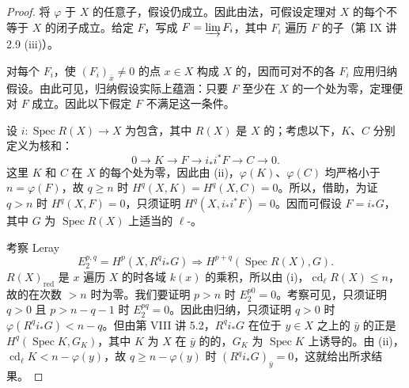 \begin{proof}
将 $\varphi$ 于 $X$ 的任意子，假设仍成立。因此由法，可假设定理对 $X$ 的每个不等于
$X$ 的闭子成立。给定 $F$，写成 $F=\varinjlim F_i$，其中 $F_i$ 遍历 $F$ 的子（第 IX 讲 2.9 (iii)）。

对每个 $F_i$，使 $(F_i)_{\bar x}\ne0$ 的点 $x\in X$ 构成 $X$ 的，因而可对不的各 $F_i$ 应用归纳假设。由此可见，归纳假设实际上蕴涵：只要 $F$ 至少在 $X$ 的一个处为零，定理便对 $F$ 成立。因此以下假定 $F$ 不满足这一条件。

设 $i:\operatorname{Spec}R(X)\to X$ 为包含，其中 $R(X)$ 是 $X$ 的；考虑以下，$K$、$C$ 分别定义为核和：
\[
 0\longrightarrow K\longrightarrow F\longrightarrow i_*i^*F\longrightarrow C\longrightarrow0.
\]
这里 $K$ 和 $C$ 在 $X$ 的每个处为零，因此由 (ii)，$\varphi(K)$、$\varphi(C)$ 均严格小于 $n=\varphi(F)$，故 $q\geq n$ 时 $H^q(X,K)=H^q(X,C)=0$。所以，借助，为证 $q>n$ 时 $H^q(X,F)=0$，只须证明 $H^q(X,i_*i^*F)=0$。因而可假设 $F=i_*G$，其中 $G$ 为 $\operatorname{Spec}R(X)$ 上适当的 $\ell$-。

考察 Leray 
\[
 E_2^{p,q}=H^p(X,R^qi_*G)\Longrightarrow H^{p+q}(\operatorname{Spec}R(X),G).
\]
$R(X)_{\mathrm{red}}$ 是 $x$ 遍历 $X$ 的时各域 $k(x)$ 的乘积，所以由 (i)，$\operatorname{cd}_\ell R(X)\leq n$，故的在次数 $>n$ 时为零。我们要证明 $p>n$ 时 $E_2^{p0}=0$。考察可见，只须证明 $q>0$ 且 $p>n-q-1$ 时 $E_2^{pq}=0$。因此由归纳，只须证明 $q>0$ 时 $\varphi(R^qi_*G)<n-q$。但由第 VIII 讲 5.2，$R^qi_*G$ 在位于 $y\in X$ 之上的 $\bar y$ 的正是 $H^q(\operatorname{Spec}K,G_K)$，其中 $K$ 为 $X$ 在 $\bar y$ 的的，$G_K$ 为 $\operatorname{Spec}K$ 上诱导的。由 (ii)，$\operatorname{cd}_\ell K<n-\varphi(y)$，故 $q\geq n-\varphi(y)$ 时 $(R^qi_*G)_{\bar y}=0$，这就给出所求结果。
\end{proof}
